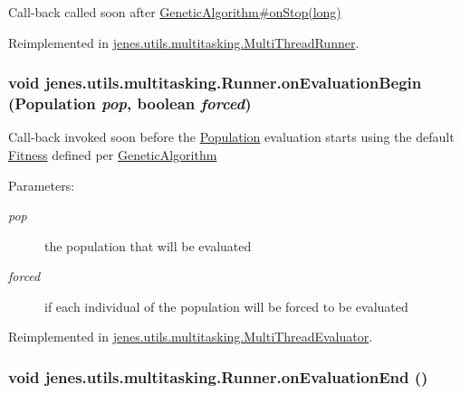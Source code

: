 Call-back called soon after \hyperlink{}{GeneticAlgorithm\#onStop(long)} 

Reimplemented in \hyperlink{classjenes_1_1utils_1_1multitasking_1_1_multi_thread_runner_5f00a9b63ff1322d586ad62ec060d597}{jenes.utils.multitasking.MultiThreadRunner}.\hypertarget{classjenes_1_1utils_1_1multitasking_1_1_runner_6ec13cf0fb2ff03461a3a397421505cf}{
\subsubsection[onEvaluationBegin]{\setlength{\rightskip}{0pt plus 5cm}void jenes.utils.multitasking.Runner.onEvaluationBegin (Population {\em pop}, \/  boolean {\em forced})}}
\label{classjenes_1_1utils_1_1multitasking_1_1_runner_6ec13cf0fb2ff03461a3a397421505cf}


Call-back invoked soon before the \hyperlink{}{Population} evaluation starts using the default \hyperlink{}{Fitness} defined per \hyperlink{}{GeneticAlgorithm}

\begin{Desc}
\item[Parameters:]
\begin{description}
\item[{\em pop}]the population that will be evaluated \item[{\em forced}]if each individual of the population will be forced to be evaluated \end{description}
\end{Desc}


Reimplemented in \hyperlink{classjenes_1_1utils_1_1multitasking_1_1_multi_thread_evaluator_2a9d9427ca8c2b8a9dfc541c85bada42}{jenes.utils.multitasking.MultiThreadEvaluator}.\hypertarget{classjenes_1_1utils_1_1multitasking_1_1_runner_82c84ad942296d62849248b107ec3a2c}{
\subsubsection[onEvaluationEnd]{\setlength{\rightskip}{0pt plus 5cm}void jenes.utils.multitasking.Runner.onEvaluationEnd ()}}
\label{classjenes_1_1utils_1_1multitasking_1_1_runner_82c84ad942296d62849248b107ec3a2c}


